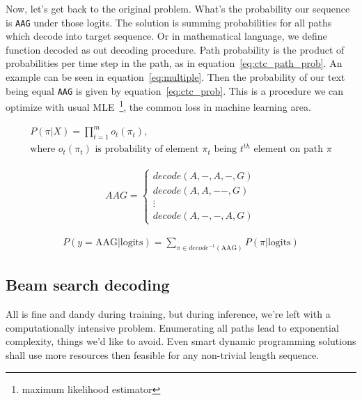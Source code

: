 \documentclass[times, utf8, diplomski, english]{fer}
\begin{document}
Now, let's get back to the original problem. What's the probability our sequence is \texttt{AAG} under those logits. 
The solution is summing probabilities for all paths which decode into target sequence. 
Or in mathematical language, we define function decoded as out decoding procedure. 
Path probability is the product of probabilities per time step in the path, as in equation~\ref{eq:ctc_path_prob}.
An example can be seen in equation~\ref{eq:multiple}. 
Then the probability of our text being equal \texttt{AAG} is given by equation~\ref{eq:ctc_prob}.
This is a procedure we can optimize with usual MLE~\footnote{maximum likelihood estimator}, the common loss in machine learning area.

\begin{equation}
\begin{gathered}
\label{eq:ctc_path_prob}
P(\pi | X) = \prod_{t=1}^{m} o_t(\pi_t), \\
\text{where $o_t(\pi_t)$ is probability of element $\pi_t$ being $t^{th}$ element on path $\pi$}
\end{gathered}
\end{equation}

\begin{equation}
\begin{gathered}
\label{eq:multiple}
AAG = \begin{cases}
decode(A, -, A, -, G) \\
decode(A, A, - -, G) \\
\vdots \\
decode(A, -, -, A, G) 
\end{cases}
\end{gathered}
\end{equation}

\begin{equation}
\begin{gathered}
\label{eq:ctc_prob}
P(y = \text{AAG}| \text{logits}) = \sum_{\pi \in decode^{-1}(\text{AAG})} P(\pi | \text{logits})
\end{gathered}
\end{equation}

\subsection{Beam search decoding}
\label{subsec:beam-search}

All is fine and dandy during training, but during inference, we're left with a computationally intensive problem. Enumerating all paths lead to exponential complexity, things we'd like to avoid. Even smart dynamic programming solutions shall use more resources then feasible for any non-trivial length sequence. 
\end{document}
